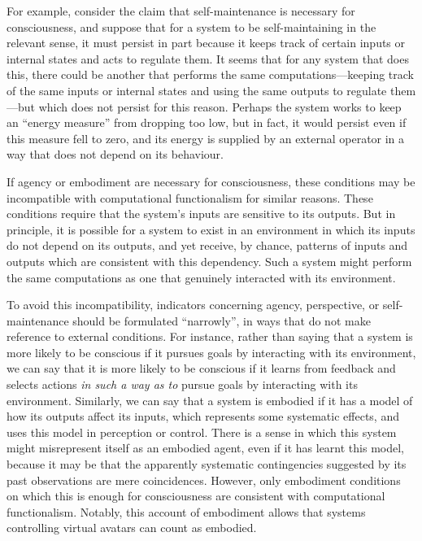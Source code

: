 \documentclass[12pt]{article}
\begin{document}
For example, consider the claim that self-maintenance is necessary for consciousness, and suppose that for a system to be self-maintaining in the relevant sense, it must persist in part because it keeps track of certain inputs or internal states and acts to regulate them. It seems that for any system that does this, there could be another that performs the same computations—keeping track of the same inputs or internal states and using the same outputs to regulate them—but which does not persist for this reason. Perhaps the system works to keep an ``energy measure'' from dropping too low, but in fact, it would persist even if this measure fell to zero, and its energy is supplied by an external operator in a way that does not depend on its behaviour.

If agency or embodiment are necessary for consciousness, these conditions may be incompatible with computational functionalism for similar reasons. These conditions require that the system’s inputs are sensitive to its outputs. But in principle, it is possible for a system to exist in an environment in which its inputs do not depend on its outputs, and yet receive, by chance, patterns of inputs and outputs which are consistent with this dependency. Such a system might perform the same computations as one that genuinely interacted with its environment.

To avoid this incompatibility, indicators concerning agency, perspective, or self-maintenance should be formulated ``narrowly'', in ways that do not make reference to external conditions. For instance, rather than saying that a system is more likely to be conscious if it pursues goals by interacting with its environment, we can say that it is more likely to be conscious if it learns from feedback and selects actions \textit{in such a way as to} pursue goals by interacting with its environment. Similarly, we can say that a system is embodied if it has a model of how its outputs affect its inputs, which represents some systematic effects, and uses this model in perception or control. There is a sense in which this system might misrepresent itself as an embodied agent, even if it has learnt this model, because it may be that the apparently systematic contingencies suggested by its past observations are mere coincidences. However, only embodiment conditions on which this is enough for consciousness are consistent with computational functionalism. Notably, this account of embodiment allows that systems controlling virtual avatars can count as embodied.
\end{document}

